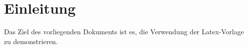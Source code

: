 \chapter{Einleitung}

Das Ziel des vorliegenden Dokuments ist es, die Verwendung der Latex-Vorlage zu demonstrieren.